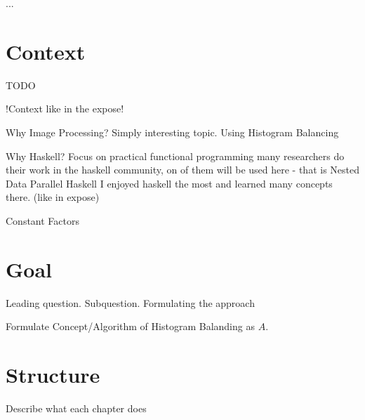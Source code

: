 
...

\section{Context}
  TODO
  
  !Context like in the expose!
  
  Why Image Processing? Simply interesting topic. Using Histogram Balancing
  
  Why Haskell?
    Focus on practical functional programming
    many researchers do their work in the haskell community,
      on of them will be used here - that is Nested Data Parallel Haskell
    I enjoyed haskell the most and learned many concepts there. (like in expose)
    
    Constant Factors

\section{Goal}
  Leading question. Subquestion.
  Formulating the approach
  
  Formulate Concept/Algorithm of Histogram Balanding as $A$.

\section{Structure}
  Describe what each chapter does


